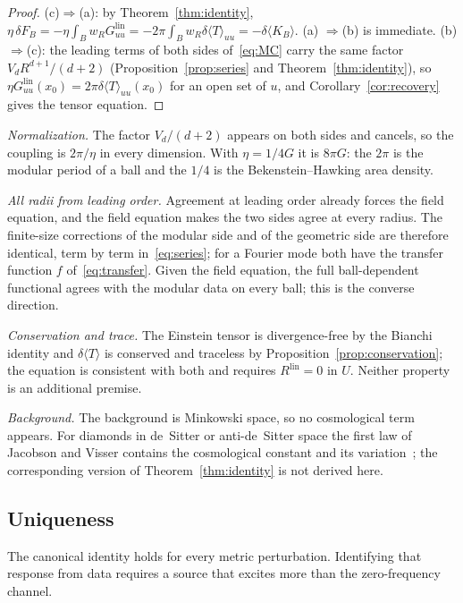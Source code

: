 \documentclass[12pt]{article}
\theoremstyle{definition}
\theoremstyle{remark}
\newcommand{\Glin}{G^{\mathrm{lin}}}
\newcommand{\dT}{\delta\langle T\rangle}
\newcommand{\ev}[1]{\langle #1\rangle}
\begin{document}
\begin{proof}
(c)\(\Rightarrow\)(a): by Theorem~\ref{thm:identity},
\(\eta\,\delta F_B=-\eta\int_Bw_R\Glin_{uu}=-2\pi\int_Bw_R\dT_{uu}=-\delta\ev{K_B}\). (a)
\(\Rightarrow\)(b) is immediate. (b)\(\Rightarrow\)(c): the leading terms of both sides
of~\eqref{eq:MC} carry the same factor \(V_dR^{d+1}/(d+2)\)
(Proposition~\ref{prop:series} and Theorem~\ref{thm:identity}), so
\(\eta\Glin_{uu}(x_0)=2\pi\dT_{uu}(x_0)\) for an open set of \(u\), and
Corollary~\ref{cor:recovery} gives the tensor equation.
\end{proof}

\emph{Normalization.} The factor \(V_d/(d+2)\) appears on both sides and cancels, so the
coupling is \(2\pi/\eta\) in every dimension. With \(\eta=1/4G\) it is \(8\pi G\): the
\(2\pi\) is the modular period of a ball and the \(1/4\) is the Bekenstein--Hawking area
density.

\emph{All radii from leading order.} Agreement at leading order already forces the field
equation, and the field equation makes the two sides agree at every radius. The finite-size
corrections of the modular side and of the geometric side are therefore identical, term by
term in~\eqref{eq:series}; for a Fourier mode both have the transfer function \(f\)
of~\eqref{eq:transfer}. Given the field equation, the full ball-dependent
functional agrees with the modular data on every ball; this is the converse direction.

\emph{Conservation and trace.} The Einstein tensor is divergence-free by the Bianchi
identity and \(\dT\) is conserved and traceless by Proposition~\ref{prop:conservation}; the
equation is consistent with both and requires \(R^{\mathrm{lin}}=0\) in \(U\). Neither
property is an additional premise.

\emph{Background.} The background is Minkowski space, so no cosmological term appears.
For diamonds in de~Sitter or anti-de~Sitter space the first law of Jacobson and Visser
contains the cosmological constant and its variation~\cite{JacobsonVisser2019}; the
corresponding version of Theorem~\ref{thm:identity} is not derived here.

\subsection{Uniqueness}\label{subsec:uniqueness}

The canonical identity holds for every metric perturbation. Identifying that response
from data requires a source that excites more than the zero-frequency channel.
\end{document}
